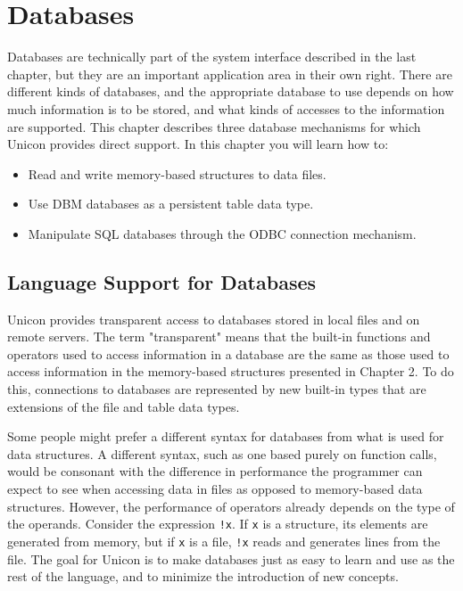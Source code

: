 \chapter{Databases}

Databases are technically part of the system interface
described in the last chapter, but they are an important application
area in their own right. There are different kinds of databases, and
the appropriate database to use depends on how much information is to
be stored, and what kinds of accesses to the information are supported.
This chapter describes three database mechanisms for which Unicon
provides direct support. In this chapter you will learn how to:

\begin{itemize}
\item Read and write memory-based structures to data files.
\item Use DBM databases as a persistent table data type.
\item Manipulate SQL databases through the ODBC connection mechanism.
\end{itemize}

\section{Language Support for Databases}

Unicon provides transparent access to databases stored in local files
and on remote servers. The term
"transparent" means that the built-in
functions and operators used to access information in a database are
the same as those used to access information in the memory-based
structures presented in Chapter 2. To do this, connections to databases
are represented by new built-in types that are extensions of the file
and table data types.

Some people might prefer a different syntax for databases from what is
used for data structures. A different syntax, such as one based purely
on function calls, would be consonant with the difference in
performance the programmer can expect to see when accessing data in
files as opposed to memory-based data structures. However, the
performance of operators already depends on the type of the operands.
Consider the expression \texttt{!x}. If \texttt{x} is a structure, its
elements are generated from memory, but if \texttt{x} is a file,
\texttt{!x} reads and generates lines from the file. The goal for
Unicon is to make databases just as easy to learn and use as the rest
of the language, and to minimize the introduction of new concepts.

